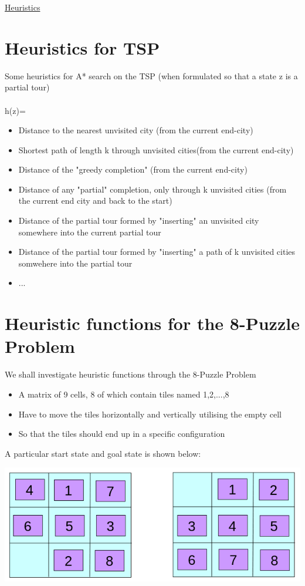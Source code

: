 \documentclass{article}[18pt]
\begin{document}
\begin{center}
\underline{\huge Heuristics}
\end{center}
\section{Heuristics for TSP}
Some heuristics for A* search on the TSP (when formulated so that a state z is a partial tour)\\
\\
h(z)=
\begin{itemize}
	\item Distance to the nearest unvisited city (from the current end-city)
	\item Shortest path of length k through unvisited cities(from the current end-city)
	\item Distance of the "greedy completion" (from the current end-city)
	\item Distance of any "partial" completion, only through k unvisited cities (from the current end city and back to the start)
	\item Distance of the partial tour formed by "inserting" an unvisited city somewhere into the current partial tour
	\item Distance of the partial tour formed by "inserting" a path of k unvisited cities somwehere into the partial tour
	\item ...
\end{itemize}
\section{Heuristic functions for the 8-Puzzle Problem}
We shall investigate heuristic functions through the 8-Puzzle Problem
\begin{itemize}
	\item A matrix of 9 cells, 8 of which contain tiles named 1,2,...,8
	\item Have to move the tiles horizontally and vertically utilising the empty cell
	\item So that the tiles should end up in a specific configuration
\end{itemize}
A particular start state and goal state is shown below:
\begin{center}
	\includegraphics[scale=0.7]{8-puzzle}
\end{center}
\end{document}
